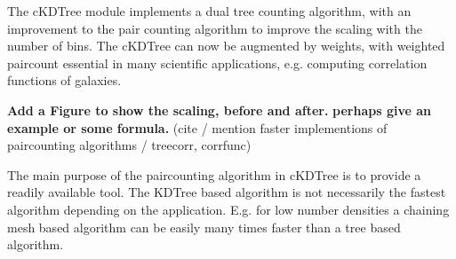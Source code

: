 The cKDTree module implements a dual tree counting algorithm\cite{Moore2000ar},
with an improvement to the pair counting algorithm to improve the scaling
with the number of bins. The cKDTree can now be augmented by weights, with 
weighted paircount essential in many scientific applications, e.g. computing 
correlation functions of galaxies\cite{0004-637X-750-1-38}.

\textbf{Add a Figure to show the scaling, before and after.}
\textbf{perhaps give an example or some formula.}
(cite / mention faster implementions of paircounting algorithms / treecorr, corrfunc)

The main purpose of the paircounting algorithm in cKDTree is to provide a readily
available tool. The KDTree based algorithm is not necessarily the fastest algorithm
depending on the application. E.g. for low number densities a chaining mesh based algorithm
can be easily many times faster than a tree based algorithm.

